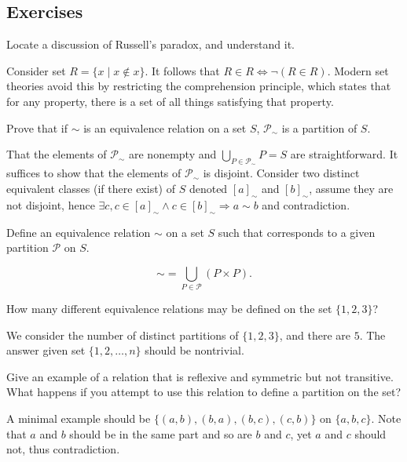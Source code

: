 \subsection*{Exercises}

\begin{exercise}
  Locate a discussion of Russell’s paradox, and understand it.
\end{exercise}

Consider set $R=\{x\mid x\notin x\}$. It follows that $R\in R \Leftrightarrow\neg(R\in R)$. Modern set theories avoid this by restricting the comprehension principle, which states that for any property, there is a set of all things satisfying that property.

\begin{exercise}
  Prove that if $\sim$ is an equivalence relation on a set $S$, $\mathcal{P}_{\sim}$ is a partition of $S$.
\end{exercise}

That the elements of $\mathcal{P}_{\sim}$ are nonempty and $\bigcup_{P\in \mathcal{P}_{\sim}}P=S$ are straightforward. It suffices to show that the elements of $\mathcal{P}_{\sim}$ is disjoint. Consider two distinct equivalent classes (if there exist) of $S$ denoted $[a]_{\sim}$ and $[b]_{\sim}$, assume they are not disjoint, hence $\exists c, c\in[a]_{\sim}\wedge c\in[b]_{\sim}\Rightarrow a\sim b$ and contradiction.

\begin{exercise}
  Define an equivalence relation $\sim$ on a set $S$ such that corresponds to a given partition $\mathcal{P}$ on $S$.
\end{exercise}

\[
  \sim=\bigcup_{P\in \mathcal{P}}(P\times P).
\]

\begin{exercise}
  How many diﬀerent equivalence relations may be defined on the set $\{1,2,3\}$?
\end{exercise}

We consider the number of distinct partitions of $\{1,2,3\}$, and there are $5$. The answer given set $\{1,2,\dots,n\}$ should be nontrivial.

\begin{exercise}
  Give an example of a relation that is reflexive and symmetric but not transitive. What happens if you attempt to use this relation to define a partition on the set?
\end{exercise}

A minimal example should be $\{(a,b),(b,a),(b,c),(c,b)\}$ on $\{a,b,c\}$. Note that $a$ and $b$ should be in the same part and so are $b$ and $c$, yet $a$ and $c$ should not, thus contradiction.

